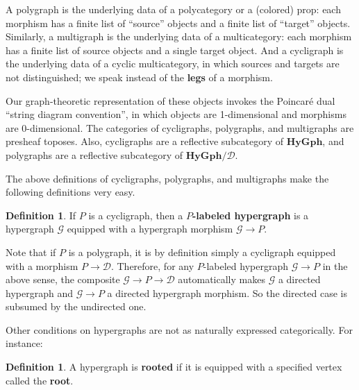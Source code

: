 \documentclass{article}
\theoremstyle{definition}
\newtheorem{defn}[thm]{Definition}
\theoremstyle{remark}
\def\G{\mathcal{G}}
\def\hy{\mathbf{HyGph}}
\def\dhy{\mathcal{D}}
\begin{document}
A polygraph is the underlying data of a polycategory or a (colored) prop: each morphism has a finite list of ``source'' objects and a finite list of ``target'' objects.
Similarly, a multigraph is the underlying data of a multicategory: each morphism has a finite list of source objects and a single target object.
And a cycligraph is the underlying data of a cyclic multicategory, in which sources and targets are not distinguished; we speak instead of the \textbf{legs} of a morphism.

Our graph-theoretic representation of these objects invokes the Poincar\'e dual ``string diagram convention'', in which objects are 1-dimensional and morphisms are 0-dimensional.
The categories of cycligraphs, polygraphs, and multigraphs are presheaf toposes.
Also, cycligraphs are a reflective subcategory of $\hy$, and polygraphs are a reflective subcategory of $\hy/\dhy$.

The above definitions of cycligraphs, polygraphs, and multigraphs make the following definitions very easy.

\begin{defn}\label{thm:labeled}
  If $P$ is a cycligraph, then a \textbf{$P$-labeled hypergraph} is a hypergraph $\G$ equipped with a hypergraph morphism $\G\to P$.
\end{defn}

Note that if $P$ is a polygraph, it is by definition simply a cycligraph equipped with a morphism $P\to \dhy$.
Therefore, for any $P$-labeled hypergraph $\G\to P$ in the above sense, the composite $\G\to P\to\dhy$ automatically makes $\G$ a directed hypergraph and $\G\to P$ a directed hypergraph morphism.
So the directed case is subsumed by the undirected one.

Other conditions on hypergraphs are not as naturally expressed categorically.
For instance:

\begin{defn}
  A hypergraph is \textbf{rooted} if it is equipped with a specified vertex called the \textbf{root}.
\end{defn}
\end{document}
